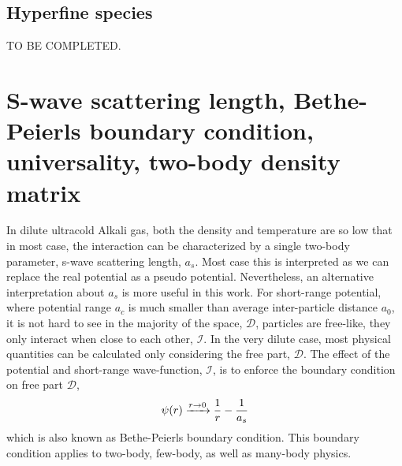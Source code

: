 \subsection{Hyperfine species}
TO BE COMPLETED. 


\section{S-wave scattering length, Bethe-Peierls boundary condition, universality, two-body density matrix\label{sec:intro:as}}
In dilute ultracold Alkali gas, both the density and temperature are so low that in most case, the interaction can be characterized by a single two-body parameter, s-wave scattering length, $a_s$.  Most case this is  interpreted as we can replace the real potential as a pseudo potential\cite{pethick}.  Nevertheless, an alternative interpretation about $a_s$ is more useful in this work\cite{LeggettBEC, Tan2008-1,Tan2008-2,CombescotTan}.  For short-range potential, where potential range $a_c$ is much smaller than average inter-particle distance $a_0$, it is not hard to see in the majority of the space, $\mathcal{D}$, particles are free-like, they only interact when close to each other, $\mathcal{I}$.  In the very dilute case, most physical quantities can be calculated only considering the free part, $\mathcal{D}$.  The effect of the potential and short-range wave-function, $\mathcal{I}$, is to enforce the boundary condition on free part $\mathcal{D}$, 
\begin{equation}\label{eq:intro:Bethe}
\psi(r)\xrightarrow{r\to0}\frac{1}{r}-\frac{1}{a_s}
\end{equation}
which is also known as Bethe-Peierls boundary condition\cite{BethePeierls}.  This boundary condition applies to two-body, few-body, as well as many-body physics.  

